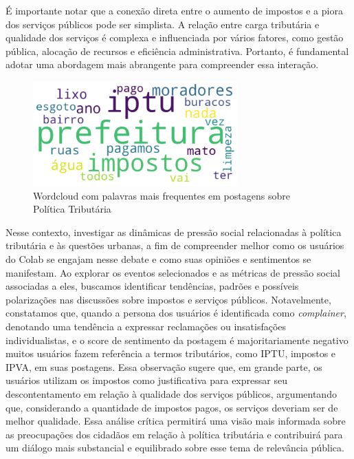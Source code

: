 É importante notar que a conexão direta entre o aumento de impostos e a piora dos serviços públicos pode ser simplista. A relação entre carga tributária e qualidade dos serviços é complexa e influenciada por vários fatores, como gestão pública, alocação de recursos e eficiência administrativa. Portanto, é fundamental adotar uma abordagem mais abrangente para compreender essa interação.

\begin{figure}[htb]
	\centering
	\includegraphics[width=0.7\textwidth]{images/wordcloud_taxes.png}
	\caption{Wordcloud com palavras mais frequentes em postagens sobre Política Tributária}
	\label{fig:wordcloud_taxes}
\end{figure}

Nesse contexto, investigar as dinâmicas de pressão social relacionadas à política tributária e às questões urbanas, a fim de compreender melhor como os usuários do Colab se engajam nesse debate e como suas opiniões e sentimentos se manifestam. Ao explorar os eventos selecionados e as métricas de pressão social associadas a eles, buscamos identificar tendências, padrões e possíveis polarizações nas discussões sobre impostos e serviços públicos. Notavelmente, constatamos que, quando a persona dos usuários é identificada como \textit{complainer}, denotando uma tendência a expressar reclamações ou insatisfações individualistas, e o score de sentimento da postagem é majoritariamente negativo muitos usuários fazem referência a termos tributários, como IPTU, impostos e IPVA, em suas postagens. Essa observação sugere que, em grande parte, os usuários utilizam os impostos como justificativa para expressar seu descontentamento em relação à qualidade dos serviços públicos, argumentando que, considerando a quantidade de impostos pagos, os serviços deveriam ser de melhor qualidade. Essa análise crítica permitirá uma visão mais informada sobre as preocupações dos cidadãos em relação à política tributária e contribuirá para um diálogo mais substancial e equilibrado sobre esse tema de relevância pública.

